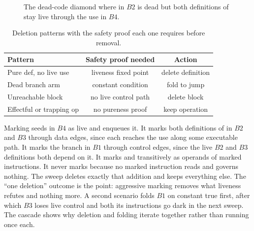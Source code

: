 \begin{figure}
\caption{The dead-code diamond where  in $B2$ is dead but both definitions of  stay live through the use in $B4$.}
\label{fig:ch15-cfg}
\end{figure}

\begin{table}
\caption{Deletion patterns with the safety proof each one requires before removal.}
\label{tab:ch15-patterns}
\begin{tabular}{lcc}
\toprule
Pattern & Safety proof needed & Action \\
\midrule
Pure def, no live use & liveness fixed point & delete definition \\
Dead branch arm & constant condition & fold to jump \\
Unreachable block & no live control path & delete block \\
Effectful or trapping op & no pureness proof & keep operation \\
\bottomrule
\end{tabular}
\end{table}

Marking seeds  in $B4$ as live and enqueues it.
It marks both definitions of  in $B2$ and $B3$ through data edges, since each reaches the use along some executable path.
It marks the branch in $B1$ through control edges, since the live $B2$ and $B3$ definitions both depend on it.
It marks  and  transitively as operands of marked instructions.
It never marks  because no marked instruction reads  and  governs nothing.
The sweep deletes exactly that addition and keeps everything else.
The \enquote{one deletion} outcome is the point: aggressive marking removes what liveness refutes and nothing more.
A second scenario folds $B1$ on constant true first, after which $B3$ loses live control and both its instructions go dark in the next sweep.
The cascade shows why deletion and folding iterate together rather than running once each.

